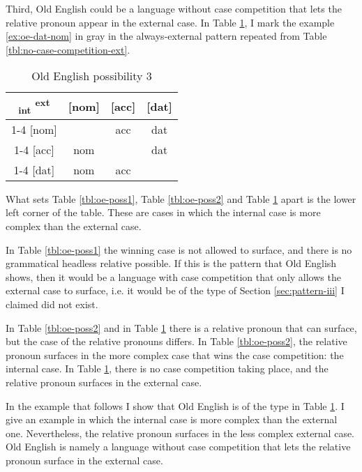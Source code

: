 Third, Old English could be a language without case competition that lets the relative pronoun appear in the external case. In Table \ref{tbl:oe-poss3}, I mark the example \ref{ex:oe-dat-nom} in gray in the always-external pattern repeated from Table \ref{tbl:no-case-competition-ext}.

 \begin{table}[H]
   \center
   \caption{Old English possibility 3}
   \begin{tabular}{c|c|c|c}
     \toprule
    \textsubscript{\ac{int}} \textsuperscript{\ac{ext}}
           & [\ac{nom}]
           & [\ac{acc}]
           & [\ac{dat}]
           \\ \cmidrule{1-4}
       [\ac{nom}]
           & \xcancel{\phantom{xx}}
           & \ac{acc}
           & \cellcolor{LG}\ac{dat}
           \\ \cmidrule{1-4}
       [\ac{acc}]
           & \ac{nom}
           & \xcancel{\phantom{xx}}
           & \ac{dat}
           \\ \cmidrule{1-4}
       [\ac{dat}]
           & \ac{nom}
           & \ac{acc}
           & \xcancel{\phantom{xx}}
           \\
     \bottomrule
   \end{tabular}
   \label{tbl:oe-poss3}
 \end{table}

What sets Table \ref{tbl:oe-poss1}, Table \ref{tbl:oe-poss2} and Table \ref{tbl:oe-poss3} apart is the lower left corner of the table. These are cases in which the internal case is more complex than the external case.

In Table \ref{tbl:oe-poss1} the winning case is not allowed to surface, and there is no grammatical headless relative possible. If this is the pattern that Old English shows, then it would be a language with case competition that only allows the external case to surface, i.e. it would be of the type of Section \ref{sec:pattern-iii} I claimed did not exist.

In Table \ref{tbl:oe-poss2} and in Table \ref{tbl:oe-poss3} there is a relative pronoun that can surface, but the case of the relative pronouns differs. In Table \ref{tbl:oe-poss2}, the relative pronoun surfaces in the more complex case that wins the case competition: the internal case. In Table \ref{tbl:oe-poss3}, there is no case competition taking place, and the relative pronoun surfaces in the external case.

In the example that follows I show that Old English is of the type in Table \ref{tbl:oe-poss3}. I give an example in which the internal case is more complex than the external one. Nevertheless, the relative pronoun surfaces in the less complex external case. Old English is namely a language without case competition that lets the relative pronoun surface in the external case.


